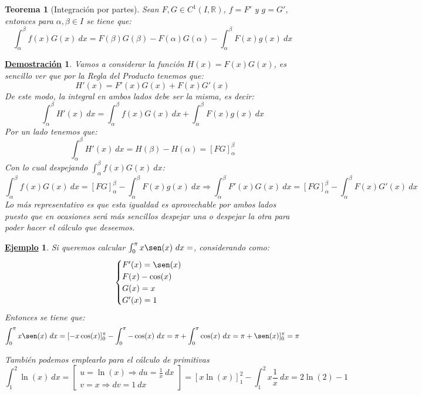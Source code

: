 \documentclass[10pt,a4paper,openright]{book}
\theoremstyle{break}
\newtheorem{theo}{Teorema}[chapter]
\newtheorem*{demo}{\underline{Demostración}}
\newtheorem{ej}{\underline{Ejemplo}}[chapter]
\newcommand{\dif}[1]{\ d#1}
\begin{document}
\begin{theo}[Integración por partes]
Sean $F,G\in C^1(I,\mathbb R)$, $f=F'$ y $g=G'$, entonces  para $\alpha,\beta\in I$ se tiene que:
$$\int_{\alpha}^{\beta} f(x)G(x)\dif{x} = F(\beta)G(\beta) - F(\alpha)G(\alpha)-\int_{\alpha}^{\beta} F(x)g(x)\dif{x}$$
\end{theo}
\begin{demo}
Vamos a considerar la función $H(x)=F(x)G(x)$, es sencillo ver que por la Regla del Producto tenemos que:
$$H'(x)=F'(x)G(x)+F(x)G'(x)$$
De este modo, la integral en ambos lados debe ser la misma, es decir:
$$\int_{\alpha}^{\beta} H'(x) \dif{x}= \int_{\alpha}^{\beta} f(x)G(x)\dif{x} + \int_{\alpha}^{\beta} F(x)g(x)\dif{x}$$
Por un lado tenemos que:
$$\int_{\alpha}^{\beta}H'(x)\dif{x} = H(\beta)-H(\alpha) = \left[FG\right]_\alpha^\beta$$
Con lo cual despejando $\displaystyle \int_{\alpha}^{\beta} f(x)G(x)\dif{x}$:
$$\int_{\alpha}^{\beta} f(x)G(x)\dif{x} = [FG]^\beta_\alpha - \int_{\alpha}^{\beta} F(x)g(x)\dif{x}\Rightarrow \int_{\alpha}^{\beta} F'(x)G(x)\dif{x} = [FG]^\beta_\alpha - \int_{\alpha}^{\beta} F(x)G'(x)\dif{x}$$
Lo más representativo es que esta igualdad es aprovechable por ambos lados puesto que en ocasiones será más sencillos despejar una o despejar la otra para poder hacer el cálculo que deseemos.
\end{demo}

\begin{ej}
Si queremos calcular $\int_0^\pi x\sen(x) \dif{x} =$, considerando como:
$$\begin{cases}F'(x)=\sen(x)\\ F(x)-\cos(x) \\ G(x)=x \\ G'(x) = 1 \end{cases}$$
Entonces se tiene que:
$$\int_0^\pi x\sen(x) \dif{x} = [-x\cos (x)]^\pi_0 - \int_0^\pi -\cos (x)\dif{x} = \pi + \int_0^\pi \cos (x)\dif{x} = \pi + \sen(x)]^\pi_0 = \pi$$

También podemos emplearlo para el cálculo de primitivas
$$\int_1^2 \ln(x) \dif{x} = \begin{bmatrix} u = \ln (x) \Rightarrow du =\frac{1}{x} \dif{x} \\ v = x \Rightarrow dv = 1\dif{x}\end{bmatrix} =[x\ln(x)]^2_1 - \int_1^2 x \frac{1}{x} \dif{x} = 2 \ln (2) - 1$$
\end{ej}
\end{document}
